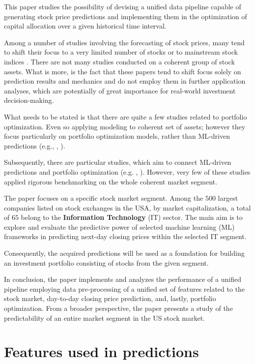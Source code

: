 \documentclass{svk_en}
\begin{document}
This paper studies the possibility of devising a unified data pipeline capable of
generating stock price predictions and implementing them in the optimization of capital allocation
over a given historical time interval.

Among a number of studies involving the forecasting of stock prices, many tend to 
shift their focus to a very limited number of stocks \cite{clanok5,konferencia1,vijh} or to mainstream
stock indices \cite{krauss, patel}. There are not many studies conducted on a coherent group of stock assets.
What is more, is the fact that these papers tend to shift focus solely on prediction results and mechanics
and do not employ them in further application analyses, which are potentially of great importance for real-world
investment decision-making.

What needs to be stated is that there are quite a few studies related
to portfolio optimization. Even so applying modeling to coherent set of assets; however they focus particularly on portfolio optimization models, rather than ML-driven predictions (e.g., \cite{hafner}, \cite{Ji_2024}).

Subsequently, there are particular studies, which aim to connect ML-driven predictions and portfolio optimization (e.g. \cite{gu}, \cite{heaton}). 
However, very few of these studies applied rigorous benchmarking on the whole coherent market segment.


The paper focuses on a specific stock market segment. Among the $500$ largest companies listed
on stock exchanges in the USA, by market capitalization, a total of $65$ belong to the 
\textbf{Information Technology} (IT) sector. The main aim is to explore and evaluate the
predictive power of selected machine learning (ML) frameworks in predicting next-day closing prices
within the selected IT segment.

Consequently, the acquired predictions will be used as a foundation for building an investment portfolio
consisting of stocks from the given segment.

In conclusion, the paper implements and analyzes the performance of a unified pipeline employing data pre-processing
of a unified set of features related to the stock market, day-to-day closing price prediction, and, lastly, portfolio
optimization. From a broader perspective, the paper presents a study of the predictability of an entire market segment in the
US stock market.

\section{Features used in predictions}
\end{document}
